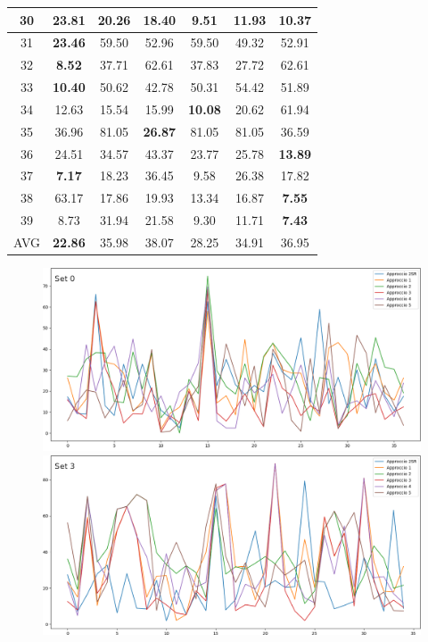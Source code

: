 \documentclass[journal,A4paper,compsoc,epsfig]{IEEEtran}
\begin{document}
\begin{table}
\begin{tabular}{|c||c|c|c|c|c|c|}
        30 &23.81 &20.26 &18.40 &\textbf{9.51} &11.93 &10.37 \\ \hline
        31 &\textbf{23.46} &59.50 &52.96 &59.50 &49.32 &52.91 \\ \hline
        32 &\textbf{8.52} &37.71 &62.61 &37.83 &27.72 &62.61 \\ \hline
        33 &\textbf{10.40} &50.62 &42.78 &50.31 &54.42 &51.89 \\ \hline
        34 &12.63 &15.54 &15.99 &\textbf{10.08} &20.62 &61.94 \\ \hline
        35 &36.96 &81.05 &\textbf{26.87} &81.05 &81.05 &36.59 \\ \hline
        36 &24.51 &34.57 &43.37 &23.77 &25.78 &\textbf{13.89} \\ \hline
        37 &\textbf{7.17} &18.23 &36.45 &9.58 &26.38 &17.82 \\ \hline
        38 &63.17 &17.86 &19.93 &13.34 &16.87 &\textbf{7.55} \\ \hline
        39 &8.73 &31.94 &21.58 &9.30 &11.71 &\textbf{7.43} \\ \hline
        AVG &\textbf{22.86} &35.98 &38.07 &28.25 &34.91 &36.95 \\ \hline
      \end{tabular}        
    \end{table}    

    \clearpage
    \begin{figure}[!ht]
      \begin{center}
        \includegraphics[width=\textwidth]{./Fig/0/all.png}          
        \includegraphics[width=\textwidth]{./Fig/3/all.png}          
      \end{center}
    \end{figure}
\end{document}
